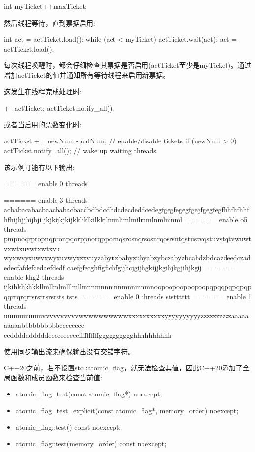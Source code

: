 \begin{cpp}
int myTicket{++maxTicket};
\end{cpp}

然后线程等待，直到票据启用:

\begin{cpp}
int act = actTicket.load();
while (act < myTicket) {
	actTicket.wait(act);
	act = actTicket.load();
}
\end{cpp}

每次线程唤醒时，都会仔细检查其票据是否启用(actTicket至少是myTicket)。通过增加actTicket的值并通知所有等待线程来启用新票据。

这发生在线程完成处理时:

\begin{cpp}
++actTicket;
actTicket.notify_all();
\end{cpp}

或者当启用的票数变化时:

\begin{cpp}
actTicket += newNum - oldNum; // enable/disable tickets
if (newNum > 0) actTicket.notify_all(); // wake up waiting threads
\end{cpp}

该示例可能有以下输出:

\begin{shell}
====== enable 0 threads

====== enable 3 threads
acbabacabacbaacbabacbacdbdbdcdbdcdecdeddcedegfgegfegegfgegfgegfegfhhfhfhhfhfhijhjjhijhji
jkjkijkjkijkkliklkilkkilmmlimlmilmmlnmlmnml
====== enable o5 threads
pmpnoqrpropnqpronpqorppnorqppornqsrosnqrsosnrqosrsntqstustvqstuvstqtvwuwtvxwtxuvwtxwtxvu
wyxwvyxuwvxwyxuvwyxzxvuyzabyuzbabyzubyabzybczabyzbcabdzbdcazdeedczadedecfafdefcedaefdedf
caefgfecghfigfichfgijhcjgijhgkijjkgihjkgjihjkgij
====== enable khg2 threads
ijkihkhkhkkllmllmlmlllmllmnnmnnmnnmnnmnmnoopoopoopoopoopqpqqpqpqpqpqqrrqrqrrsrsrrsrsrsts
tsts
====== enable 0 threads
ststttttt
====== enable 1 threads
uuuuuuuuuuvvvvvvvvvvwwwwwwwwwwxxxxxxxxxxyyyyyyyyyyzzzzzzzzzzaaaaaaaaaabbbbbbbbbbcccccccc
ccddddddddddeeeeeeeeeeffffffffffgggggggggghhhhhhhhhh
\end{shell}

使用同步输出流来确保输出没有交错字符。


C++20之前，若不设置std::atomic\_flag，就无法检查其值，因此C++20添加了全局函数和成员函数来检查当前值:

\begin{itemize}
\item
atomic\_flag\_test(const atomic\_flag*) noexcept;

\item
atomic\_flag\_test\_explicit(const atomic\_flag*, memory\_order) noexcept;

\item
atomic\_flag::test() const noexcept;

\item
atomic\_flag::test(memory\_order) const noexcept;
\end{itemize}